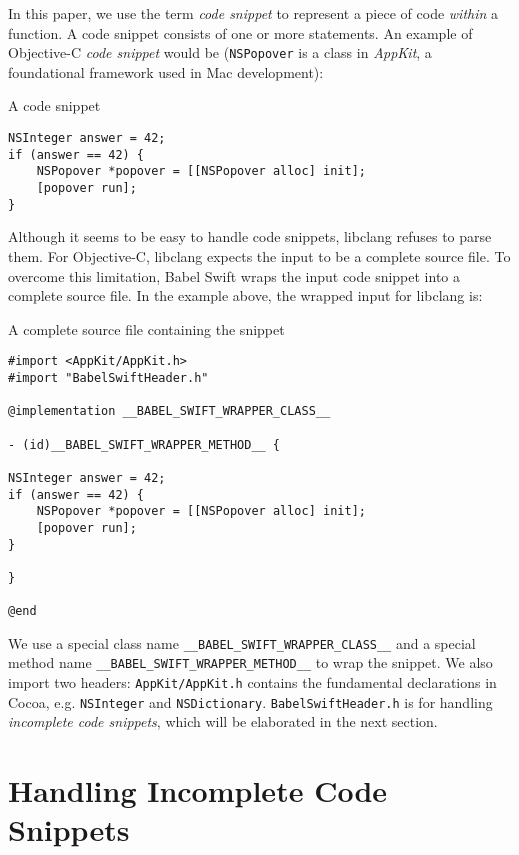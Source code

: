 \documentclass{sfuthesis}
\begin{document}
In this paper, we use the term \emph{code snippet} to represent a piece of code \emph{within} a function. A code snippet consists of one or more statements. An example of Objective-C \emph{code snippet} would be (\texttt{NSPopover} is a class in \emph{AppKit}, a foundational framework used in Mac development):

\begin{listing}
\caption{A code snippet}
\begin{verbatim}
NSInteger answer = 42;
if (answer == 42) {
    NSPopover *popover = [[NSPopover alloc] init];
    [popover run];
}
\end{verbatim}
\end{listing}

Although it seems to be easy to handle code snippets, libclang refuses to parse them. For Objective-C, libclang expects the input to be a complete source file. To overcome this limitation, Babel Swift wraps the input code snippet into a complete source file. In the example above, the wrapped input for libclang is:

\begin{listing}
\caption{A complete source file containing the snippet}	
\label{lst:snippet}
\begin{verbatim}
#import <AppKit/AppKit.h>
#import "BabelSwiftHeader.h"

@implementation __BABEL_SWIFT_WRAPPER_CLASS__

- (id)__BABEL_SWIFT_WRAPPER_METHOD__ {

NSInteger answer = 42;
if (answer == 42) {
    NSPopover *popover = [[NSPopover alloc] init];
    [popover run];
}

}

@end
\end{verbatim}
\end{listing}

We use a special class name \texttt{\_\_BABEL\_SWIFT\_WRAPPER\_CLASS\_\_} and a special method name \texttt{\_\_BABEL\_SWIFT\_WRAPPER\_METHOD\_\_} to wrap the snippet. We also import two headers: \texttt{AppKit/AppKit.h} contains the fundamental declarations in Cocoa, e.g. \texttt{NSInteger} and \texttt{NSDictionary}. \texttt{BabelSwiftHeader.h} is for handling \emph{incomplete code snippets}, which will be elaborated in the next section.


\section{Handling Incomplete Code Snippets}
\end{document}
